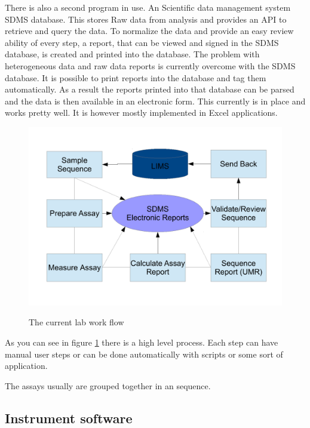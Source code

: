 \documentclass[paper=a4,twoside=false,BCOR=0mm,DIV=calc,fontsize=12pt]{scrartcl}
\begin{document}
There is also a second program in use. An Scientific data management system SDMS \cite{sdms} database. This stores Raw data from analysis and provides an API to retrieve and query the data.
To normalize the data and provide an easy review ability of every step, a report, that can be viewed and signed in the SDMS database, is created and printed into the database.
The problem with heterogeneous data and raw data reports is currently overcome with the SDMS database. It is possible to print reports into the database and tag them automatically. As a result the reports printed into that database can be parsed and the data is then available in an electronic form. This currently is in place and works pretty well.
It is however mostly implemented in Excel \cite{excel} applications.

\begin{figure}
    \begin{center}
      \includegraphics[width=1\textwidth]{./img/Laboverview.pdf}\\
    \end{center}
  \caption{The current lab work flow}
  \label{CurrentLabWorkflow}
\end{figure} 

As you can see in figure \ref{CurrentLabWorkflow} there is a high level process. Each step can have manual user steps or can be done automatically with scripts or some sort of application. 

The assays usually are grouped together in an sequence.

\subsection{Instrument software}
\end{document}
